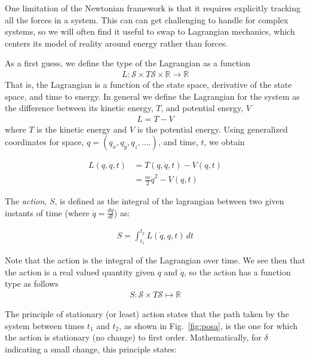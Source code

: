 \documentclass[book.tex]{subfiles}
\begin{document}
One limitation of the Newtonian framework is that it requires explicitly tracking all the forces in a system. This can can get challenging to handle for complex systems, so we will often find it useful to swap to Lagrangian mechanics, which centers its model of reality around energy rather than forces. 




As a first guess, we define the type of the Lagrangian as a function 
\begin{align}
L: \mathcal{S} \times T \mathcal{S} \times \mathbb{R} \to \mathbb{R}
\end{align} 
That is, the Lagrangian is a function of the state space, derivative of the state space, and time to energy. In general we define the Lagrangian for the system as the difference between its kinetic energy, $T$, and potential energy, $V$
\begin{align}
L = T - V
\end{align}
where $T$ is the kinetic energy and $V$ is the potential energy. Using generalized coordinates for space, $q = (q_x,q_y,q_z,....)$, and time, $t$, we obtain

\begin{align}\label{lagrangian}
L(q, \dot{q}, t) &= T(q, \dot{q}, t) -V(q, t) \\
&= \frac{m}{2}\dot{q}^{2}-V(q,t)
\end{align}

The \textit{action}, $S$, is defined as the integral of the lagrangian between two given instants of time (where $\dot{q}=\frac{dq}{dt}$) as: 

\begin{align}\label{action}
S = \int_{t_1}^{t_2}\!L(\dot{q},q,t)\,dt
\end{align}

Note that the action is the integral of the Lagrangian over time. We see then that the action is a real valued quantity given $q$ and $\dot{q}$, so the action has a function type as follows
\begin{align}
    S: \mathcal{S} \times T\mathcal{S} \mapsto \mathbb{R}
\end{align} 

The principle of stationary (or least) action states that the path taken by the system between times $t_1$ and $t_2$, as shown in Fig.~\ref{fig:posa}, is the one for which the action is stationary (no change) to first order. Mathematically, for $\delta$ indicating a small change, this principle states:
\end{document}
